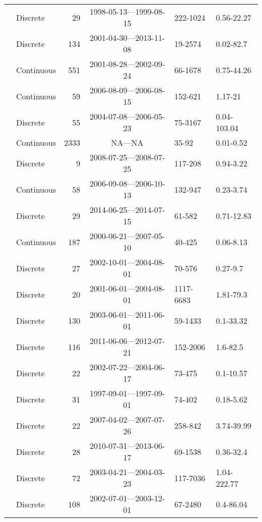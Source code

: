 \begin{longtable}{llrcll}
  \citet{lter5653} & Discrete &  29 & 1998-05-13---1999-08-15 & 222-1024 & 0.56-22.27 \\ 
  \citet{lter5689} & Discrete & 134 & 2001-04-30---2013-11-08 & 19-2574 & 0.02-82.7 \\ 
  \citet{Markager2011} & Continuous & 551 & 2001-08-28---2002-09-24 & 66-1678 & 0.75-44.26 \\ 
  \citet{Massicotte2011EA} & Continuous &  59 & 2006-08-09---2006-08-15 & 152-621 & 1.17-21 \\ 
  \citet{Moran2006} & Discrete &  55 & 2004-07-08---2006-05-23 & 75-3167 & 0.04-103.04 \\ 
  \citet{Nelson2002, Nelson2007, Nelson2010} & Continuous & 2333 & NA---NA & 35-92 & 0.01-0.52 \\ 
  \citet{Nguyen2010} & Discrete &   9 & 2008-07-25---2008-07-25 & 117-208 & 0.94-3.22 \\ 
  \citet{Norman2011} & Continuous &  58 & 2006-09-08---2006-10-13 & 132-947 & 0.23-3.74 \\ 
  \citet{Oestreich2016} & Discrete &  29 & 2014-06-25---2014-07-15 & 61-582 & 0.71-12.83 \\ 
  \citet{Osburn2007} & Continuous & 187 & 2000-06-21---2007-05-10 & 40-425 & 0.06-8.13 \\ 
  \citet{Osburn2009} & Discrete &  27 & 2002-10-01---2004-08-01 & 70-576 & 0.27-9.7 \\ 
  \citet{Osburn2011a} & Discrete &  20 & 2001-06-01---2004-08-01 & 1117-6683 & 1.81-79.3 \\ 
  \citet{Osburn2016} & Discrete & 130 & 2003-06-01---2011-06-01 & 59-1433 & 0.1-33.32 \\ 
  \citet{Polaris2012} & Discrete & 116 & 2011-06-06---2012-07-21 & 152-2006 & 1.6-82.5 \\ 
  \citet{Retamal2007} & Discrete &  22 & 2002-07-22---2004-06-17 & 73-475 & 0.1-10.57 \\ 
  \citet{Seritti1998} & Discrete &  31 & 1997-09-01---1997-09-01 & 74-402 & 0.18-5.62 \\ 
  \citet{shank2009} & Discrete &  22 & 2007-04-02---2007-07-26 & 258-842 & 3.74-39.99 \\ 
  \citet{Shen2014} & Discrete &  28 & 2010-07-31---2013-06-17 & 69-1538 & 0.36-32.4 \\ 
  \citet{Sickman2010} & Discrete &  72 & 2003-04-21---2004-03-23 & 117-7036 & 1.04-222.77 \\ 
  \citet{Spencer2007, Spencer2007a} & Discrete & 108 & 2002-07-01---2003-12-01 & 67-2480 & 0.4-86.04 \\ 

\end{longtable}
